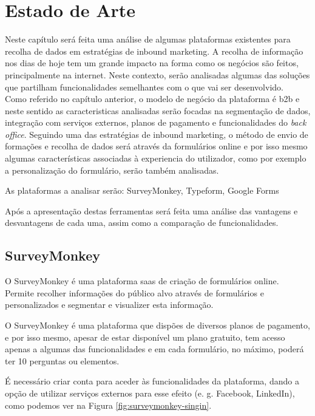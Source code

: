 \chapter{Estado de Arte}
\label{sec:estado-arte}

Neste capítulo será feita uma análise de algumas plataformas existentes para recolha de dados em estratégias de inbound marketing. A recolha de informação nos dias de hoje tem um grande impacto na forma como os negócios são feitos, principalmente na internet. Neste contexto, serão analisadas algumas das soluções que partilham funcionalidades semelhantes com o que vai ser desenvolvido.\\
Como referido no capítulo anterior, o modelo de negócio da plataforma é \gls{b2b} e neste sentido as caracteristicas analisadas serão focadas na segmentação de dados, integração com serviços externos, planos de pagamento e funcionalidades do \textit{back office}.
Seguindo uma das estratégias de inbound marketing, o método de envio de formações e recolha de dados será através da formulários online e por isso mesmo algumas características associadas à experiencia do utilizador, como por exemplo a personalização do formulário, serão também analisadas.


As plataformas a analisar serão: SurveyMonkey\cite{surveymonkey}, Typeform\cite{typeform}, Google Forms\cite{googleform}

Após a apresentação destas ferramentas será feita uma análise das vantagens e desvantagens de cada uma, assim como a comparação de funcionalidades.


\section{SurveyMonkey}
\label{surveyMonkey}

O SurveyMonkey é uma plataforma \acrfull{saas} de criação de formulários online. Permite recolher informações do público alvo através de formulários e personalizados e segmentar e visualizer esta informação.

O SurveyMonkey é uma plataforma que dispões de diversos planos de pagamento, e por isso mesmo, apesar de estar disponível um plano gratuito, tem acesso apenas a algumas das funcionalidades e em cada formulário, no máximo, poderá ter 10 perguntas ou elementos.

É necessário criar conta para aceder às funcionalidades da plataforma, dando a opção de utilizar serviços externos para esse efeito (e. g. Facebook\cite{face}, LinkedIn\cite{linkedin}), como podemos ver na Figura \ref{fig:surveymonkey-singin}.

